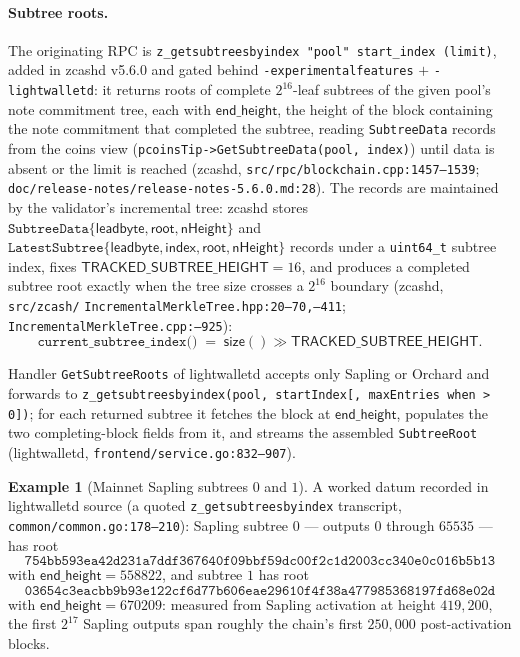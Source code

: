 \documentclass[11pt,a4paper]{article}
\theoremstyle{definition}
\newtheorem{example}[theorem]{Example}
\begin{document}
\paragraph{Subtree roots.} The originating RPC is
\texttt{z\_getsubtreesbyindex "pool" start\_index (limit)}, added in
\textsf{zcashd} v5.6.0 and gated behind
\texttt{-experimentalfeatures} $+$ \texttt{-lightwalletd}: it returns
roots of complete $2^{16}$-leaf subtrees of the given pool's note
commitment tree, each with $\mathsf{end\_height}$, the height of the
block containing the note commitment that completed the subtree, reading
\texttt{SubtreeData} records from the coins view
(\texttt{pcoinsTip->GetSubtreeData(pool, index)}) until data is absent or
the limit is reached
(\textsf{zcashd}, \texttt{src/rpc/blockchain.cpp:1457--1539};
\texttt{doc/release-notes/}\allowbreak\texttt{release-notes-5.6.0.md:28}).
The records are
maintained by the validator's incremental tree: \textsf{zcashd} stores
$\texttt{SubtreeData}\{\mathsf{leadbyte},\allowbreak \mathsf{root},
\allowbreak \mathsf{nHeight}\}$ and
$\texttt{LatestSubtree}\{\mathsf{leadbyte},\allowbreak \mathsf{index},
\allowbreak \mathsf{root},\allowbreak \mathsf{nHeight}\}$ records under
a \texttt{uint64\_t}
subtree index, fixes $\mathsf{TRACKED\_SUBTREE\_HEIGHT} = 16$, and
produces a completed subtree root exactly when the tree size crosses a
$2^{16}$ boundary (\textsf{zcashd},
\texttt{src/zcash/}\allowbreak
\texttt{IncrementalMerkleTree.hpp:20--70,--411};
\texttt{IncrementalMerkleTree.cpp:--925}):
\[
\texttt{current\_subtree\_index()} \;=\; \mathsf{size}() \gg
\mathsf{TRACKED\_SUBTREE\_HEIGHT}.
\]

Handler \texttt{GetSubtreeRoots} of \textsf{lightwalletd} accepts only
Sapling or Orchard and forwards to
\texttt{z\_getsubtreesbyindex(pool, startIndex[, maxEntries when > 0])};
for each returned subtree it fetches the block at
$\mathsf{end\_height}$, populates the two completing-block fields from
it, and streams the assembled \texttt{SubtreeRoot}
(\textsf{lightwalletd}, \texttt{frontend/service.go:832--907}).

\begin{example}[Mainnet Sapling subtrees $0$ and $1$]
A worked datum recorded in \textsf{lightwalletd} source (a quoted
\texttt{z\_getsubtreesbyindex} transcript,
\texttt{common/common.go:178--210}): Sapling subtree $0$ --- outputs $0$
through $65535$ --- has root
\[
\texttt{754bb593ea42d231a7ddf367640f09bbf59dc00f2c1d2003cc340e0c016b5b13}
\]
with $\mathsf{end\_height} = 558822$, and subtree $1$ has root
\[
\texttt{03654c3eacbb9b93e122cf6d77b606eae29610f4f38a477985368197fd68e02d}
\]
with $\mathsf{end\_height} = 670209$: measured from Sapling activation
at height $419{,}200$, the first $2^{17}$ Sapling outputs
span roughly the chain's first $250{,}000$ post-activation blocks.
\end{example}
\end{document}

